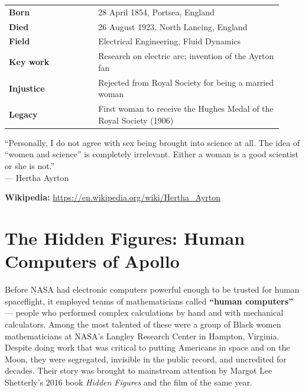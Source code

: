 \documentclass[12pt,a4paper]{article}
\makeatletter
\newcommand{\keyfacts}[1]{%
  \begin{tcolorbox}[factbox, title={Key Facts}]
  \begin{tabular}{@{}p{0.3\linewidth}p{0.62\linewidth}@{}}
  #1
  \end{tabular}
  \end{tcolorbox}
}
\newcommand{\pullquote}[2]{%
  \begin{tcolorbox}[quotebox]
  ``#1''\\[4pt]
  {\small\normalfont\color{medgray}--- #2}
  \end{tcolorbox}
}
\makeatother
\begin{document}
\keyfacts{
\textbf{Born} & 28 April 1854, Portsea, England\\[3pt]
\textbf{Died} & 26 August 1923, North Lancing, England\\[3pt]
\textbf{Field} & Electrical Engineering, Fluid Dynamics\\[3pt]
\textbf{Key work} & Research on electric arc; invention of the Ayrton fan\\[3pt]
\textbf{Injustice} & Rejected from Royal Society for being a married woman\\[3pt]
\textbf{Legacy} & First woman to receive the Hughes Medal of the Royal Society (1906)\\
}

\pullquote{Personally, I do not agree with sex being brought into science at all. The idea of ``women and science'' is completely irrelevant. Either a woman is a good scientist or she is not.}{Hertha Ayrton}

\textbf{Wikipedia:} \url{https://en.wikipedia.org/wiki/Hertha_Ayrton}

\newpage

\newpage
\section{The Hidden Figures: Human Computers of Apollo}

\begin{tcolorbox}[motivationbox, title={Who Were the Hidden Figures?}]
Before NASA had electronic computers powerful enough to be trusted for human spaceflight, it employed teams of mathematicians called \textbf{``human computers''} --- people who performed complex calculations by hand and with mechanical calculators. Among the most talented of these were a group of Black women mathematicians at NASA's Langley Research Center in Hampton, Virginia. Despite doing work that was critical to putting Americans in space and on the Moon, they were segregated, invisible in the public record, and uncredited for decades. Their story was brought to mainstream attention by Margot Lee Shetterly's 2016 book \textit{Hidden Figures} and the film of the same year.
\end{tcolorbox}
\end{document}
